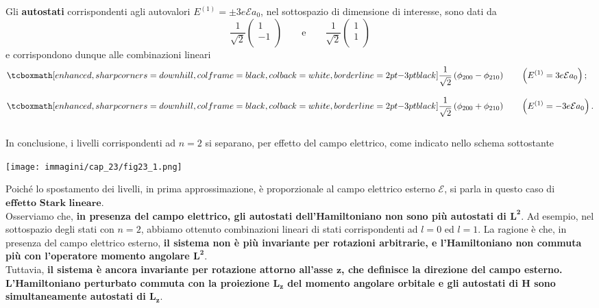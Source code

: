Gli \textbf{autostati} corrispondenti agli autovalori $E^{(1)}=\pm 3e\mathcal{E}a_0$, nel sottospazio di dimensione  di interesse, sono dati da
	\begin{equation} 
		\frac{1}{\sqrt{2}} 
		\begin{pmatrix}
		1 \\
		-1 \\
		\end{pmatrix}
		\qquad \textrm{e} \qquad 
		\frac{1}{\sqrt{2}}
		\begin{pmatrix}
		1 \\
		1 \\
		\end{pmatrix}
	\end{equation}
e corrispondono dunque alle combinazioni lineari 
\begin{align}
& \tcboxmath[enhanced, sharp corners=downhill, colframe=black, colback=white, borderline={2pt}{-3pt}{black}]{
\frac{1}{\sqrt{2}} \left( \phi_{200}-\phi_{210} \right) 
} \qquad 
\left( E^{(1)}=3e\mathcal{E}a_0 \right) ;\\[0.3cm]
&\tcboxmath[enhanced, sharp corners=downhill, colframe=black, colback=white, borderline={2pt}{-3pt}{black}]{
\frac{1}{\sqrt{2}} \left( \phi_{200}+\phi_{210} \right)
}\qquad
\left( E^{(1)}=-3e\mathcal{E}a_0 \right) .
\end{align}\\

In conclusione, i livelli corrispondenti ad $n=2$ si separano, per effetto del campo elettrico, come indicato nello schema sottostante
\begin{center}
\texttt{[image: immagini/cap\_23/fig23\_1.png]}
\end{center}
Poiché lo spostamento dei livelli, in prima approssimazione, è proporzionale al campo elettrico esterno $\mathcal{E}$, si parla in questo caso di $\textbf{effetto Stark lineare}$.\\

Osserviamo che, \textbf{in presenza del campo elettrico, gli autostati dell'Hamiltoniano non sono più autostati di $\boldsymbol{L^2}$}. Ad esempio, nel sottospazio degli stati con $n=2$, abbiamo ottenuto combinazioni lineari di stati corrispondenti ad $l=0$ ed $l=1$. La ragione è che, in presenza del campo elettrico esterno, \textbf{il sistema non è più invariante per rotazioni arbitrarie, e l'Hamiltoniano non commuta più con l'operatore momento angolare $\boldsymbol{L^2}$}.\\
Tuttavia, \textbf{il sistema è ancora invariante per rotazione attorno all'asse $\boldsymbol{z}$, che definisce la direzione del campo esterno. L'Hamiltoniano perturbato commuta con la proiezione $\boldsymbol{L_z}$ del momento angolare orbitale e gli autostati di $\boldsymbol{H}$ sono simultaneamente autostati di $\boldsymbol{L_z}$}.
